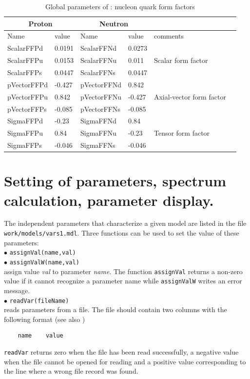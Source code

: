 \documentclass[12pt,a4paper]{article}
\begin{document}
\begin{table}[]
 \caption{Global parameters of \micro :  nucleon quark form factors}
 \label{FFTab}
\begin{center}
\begin{tabular}{|l|l|l|l|l|l|}
\hline
 \multicolumn{2}{|c|}{Proton}& \multicolumn{2}{|c|}{Neutron} & \\ \hline
  Name      &  value       &  Name      &  value     &  comments \\  \hline
ScalarFFPd  &  0.0191     &ScalarFFNd  &  0.0273  & \\
ScalarFFPu  &  0.0153     &ScalarFFNu  &  0.011 & Scalar form factor \\
ScalarFFPs  &  0.0447      &ScalarFFNs  &  0.0447   & \\
\hline
pVectorFFPd &  -0.427      &pVectorFFNd &  0.842    & \\
pVectorFFPu &   0.842      &pVectorFFNu &  -0.427   & Axial-vector form factor\\
pVectorFFPs &  -0.085      &pVectorFFNs &  -0.085   & \\
\hline
SigmaFFPd   &  -0.23       &SigmaFFNd   &  0.84     & \\
SigmaFFPu   &   0.84       &SigmaFFNu   &  -0.23    & Tensor form factor\\
SigmaFFPs   &   -0.046     &SigmaFFNs   &  -0.046   & \\
\hline
\end{tabular}
\end{center}
\end{table}

\section{Setting of parameters, spectrum calculation, parameter display.}
\label{setting_parameters}
The independent parameters that characterize a given model are listed in 
the file \\
\noindent
\verb|work/models/vars1.mdl|. Three functions can be used to set the
value of these parameters:\\

\noindent
$\bullet$ \verb|assignVal(name,val)|\\
$\bullet$ \verb|assignValW(name,val)|\\
assign value {\it val} to parameter {\it name}. The function  \verb|assignVal| returns a non-zero
value  if it
cannot recognize  a parameter name while \verb|assignValW| writes an error message.  \\
$\bullet$ \verb|readVar(fileName)|\\
reads parameters from a file. The file  should contain two columns with the 
 following  format (see also \label{sec:command})
\begin{verbatim}
    name    value
\end{verbatim}
\verb|readVar| returns zero when
the file has been read successfully, a negative value when the
file cannot be opened for reading and  a positive  value 
corresponding to the line where a wrong file record was found.
\end{document}
